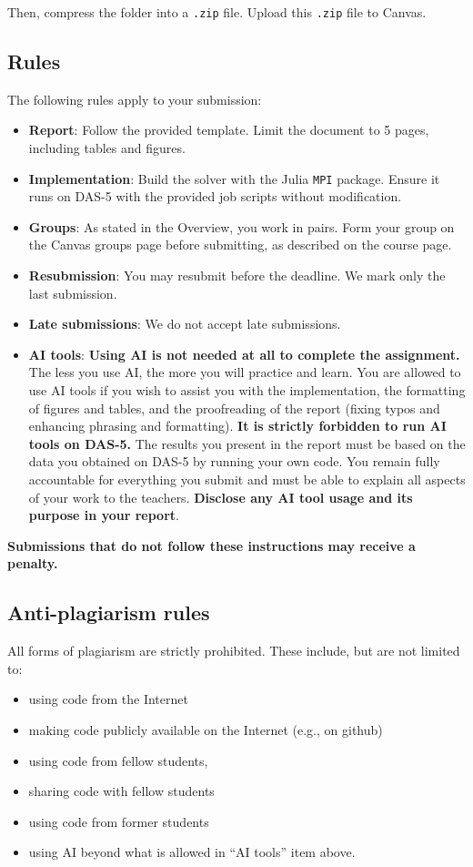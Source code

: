 \documentclass[11pt]{article}
\begin{document}
Then, compress the folder into a \texttt{.zip} file. Upload this \texttt{.zip} file to Canvas.

\subsection*{Rules}

The following rules apply to your submission:

\begin{itemize}
  \item \textbf{Report}: Follow the provided template. Limit the document to 5 pages,
        including tables and figures.
  \item \textbf{Implementation}: Build the solver with the Julia \texttt{MPI} package. Ensure it
        runs on DAS-5 with the provided job scripts without modification.
  \item \textbf{Groups}: As stated in the Overview, you work in pairs. Form your group on the Canvas groups page before submitting, as described on the course page.
  \item \textbf{Resubmission}: You may resubmit before the deadline. We mark only the last
        submission.
  \item \textbf{Late submissions}: We do not accept late submissions.
  \item \textbf{AI tools}: \textbf{Using AI is not needed at all to complete the assignment.} The less you use AI, the more you will practice and learn. You are allowed to use AI tools if you wish to assist you with the implementation, the formatting of figures and tables, and the proofreading of the report (fixing typos and enhancing phrasing and formatting). \textbf{It is strictly forbidden to run AI tools on DAS-5.} The results you present in the report must be based on the data you obtained on DAS-5 by running your own code. You remain fully accountable for everything you submit and must be able to explain all aspects of your work to the teachers. \textbf{Disclose any AI tool usage and its purpose in your report}. 
\end{itemize}

\textbf{Submissions that do not follow these instructions may receive a penalty.}

\subsection*{Anti-plagiarism rules}

All forms of plagiarism are strictly prohibited. These include, but are not limited to:
\begin{itemize}
\item using code from the Internet
\item making code publicly available on the Internet (e.g., on github)
\item using code from fellow students,
\item sharing code with fellow students
\item using code from former students
\item using AI beyond what is allowed in ``AI tools'' item above.
\end{itemize}
\end{document}
